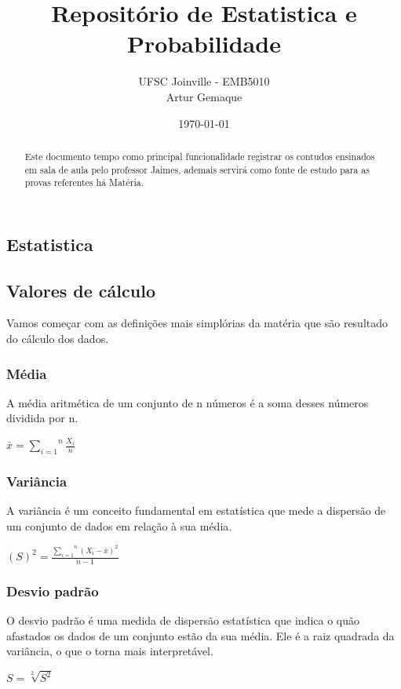 \documentclass{article}
\title{\textbf{Repositório de Estatistica e Probabilidade}}
\author{UFSC Joinville - EMB5010 \\ Artur Gemaque}
\date{\today}
\begin{document}
\maketitle

\begin{abstract}
Este documento tempo como principal funcionalidade registrar os contudos ensinados 
em sala de aula pelo professor Jaimes, ademais servirá como fonte de estudo para as 
provas referentes há Matéria.
\end{abstract}

\begin{multicols}{2} %
\section{ Estatistica}

  \subsection{Valores de cálculo}
      Vamos começar com as definições mais simplórias da matéria que são resultado do cálculo dos dados.

      \subsubsection{Média}
      A média aritmética de um conjunto de n números é a soma desses números dividida por n.
        \begin{center}
          $ \overset{\_}{x} =  \overset{n}{\underset{i=1}{\sum}} \frac{X_i}{n}  $
        \end{center}

      \subsubsection{Variância}
      A variância é um conceito fundamental em estatística que mede a dispersão de um conjunto de dados em relação à sua média.
        \begin{center}
          $ (S)^2 =  \frac{\overset{n}{\underset{i=1}{\sum}} (X_i - \overset{\_}{x} )^2 }{n - 1} $
        \end{center}

      \subsubsection{Desvio padrão}
      O desvio padrão é uma medida de dispersão estatística que indica o quão afastados os 
      dados de um conjunto estão da sua média. Ele é a raiz quadrada da variância, o que o 
      torna mais interpretável.
        \begin{center}
          $ S = \sqrt[2]{S^2}$
        \end{center}


\end{multicols}
\end{document}
